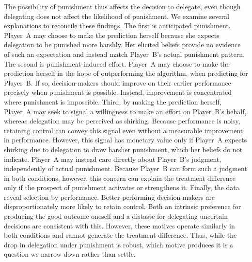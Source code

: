 The possibility of punishment thus affects the decision to delegate, even though delegating does not affect the likelihood of punishment. We examine several explanations to reconcile these findings. The first is anticipated punishment. Player~A may choose to make the prediction herself because she expects delegation to be punished more harshly. Her elicited beliefs provide no evidence of such an expectation and instead match Player~B's actual punishment pattern. The second is punishment-induced effort. Player~A may choose to make the prediction herself in the hope of outperforming the algorithm, when predicting for Player~B. If so, decision-makers should improve on their earlier performance precisely when punishment is possible. Instead, improvement is concentrated where punishment is impossible. Third, by making the prediction herself, Player~A may seek to signal a willingness to make an effort on Player~B’s behalf, whereas delegation may be perceived as shirking. Because performance is noisy, retaining control can convey this signal even without a measurable improvement in performance. However, this signal has monetary value only if Player~A expects shirking due to delegation to draw harsher punishment, which her beliefs do not indicate. Player~A may instead care directly about Player~B’s judgment, independently of actual punishment. Because Player~B can form such a judgment in both conditions, however, this concern can explain the treatment difference only if the prospect of punishment activates or strengthens it. Finally, the data reveal selection by performance. Better-performing decision-makers are disproportionately more likely to retain control. Both an intrinsic preference for producing the good outcome oneself and a distaste for delegating uncertain decisions are consistent with this. However, these motives operate similarly in both conditions and cannot generate the treatment difference. Thus, while the drop in delegation under punishment is robust, which motive produces it is a question we narrow down rather than settle.

